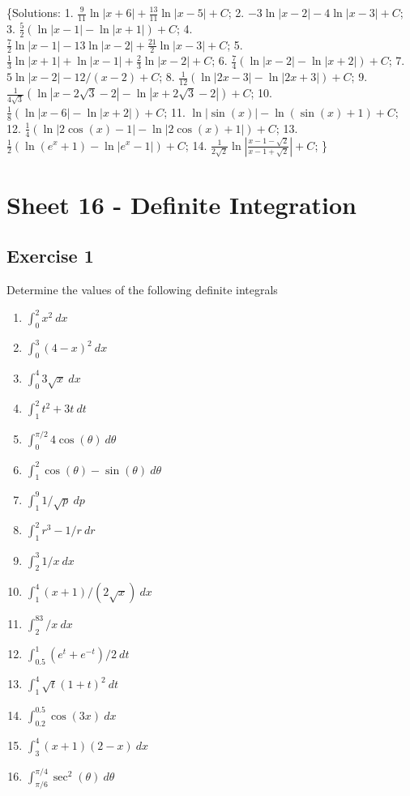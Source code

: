 \documentclass[
  11pt,
  oneside]{book}
\providecommand{\tightlist}{%
  \setlength{\itemsep}{0pt}\setlength{\parskip}{0pt}}
\newcommand{\slide}{}
\theoremstyle{definition}
\theoremstyle{definition}
\theoremstyle{definition}
\theoremstyle{definition}
\theoremstyle{remark}
\begin{document}
\{Solutions:
1. \(\frac{9}{11}\ln|x+6| + \frac{13}{11}\ln|x-5|+C\);
2. \(-3\ln|x-2|-4\ln|x-3| + C\);
3. \(\frac{5}{2}(\ln|x-1|-\ln|x+1|)+C\);
4. \(\frac{7}{2}\ln|x-1| -13\ln|x-2|+\frac{21}{2}\ln|x-3|+C\);
5. \(\frac{1}{3}\ln|x+1|+\ln|x-1|+\frac{2}{3}\ln|x-2|+C\);
6. \(\frac{7}{4}(\ln|x-2|-\ln|x+2|) +C\);
7. \(5\ln|x-2| - 12/(x-2) +C\);
8. \(\frac{1}{12}(\ln|2x-3|-\ln|2x+3|)+C\);
9. \(\frac{1}{4\sqrt{3}}\left( \ln|x-2\sqrt{3}-2| - \ln|x+2\sqrt{3}-2| \right)+C\);
10. \(\frac{1}{8}(\ln|x-6|-\ln|x+2|) +C\);
11. \(\ln|\sin(x)| - \ln(\sin(x)+1) + C\);
12. \(\frac{1}{4}\left( \ln|2\cos(x)-1| -\ln|2\cos(x)+1| \right) +C\);
13. \(\frac{1}{2}\left( \ln(e^x+1) - \ln|e^x-1| \right) + C\);
14. \(\frac{1}{2\sqrt{2}}\ln\left|\frac{x-1-\sqrt{2}}{x-1+\sqrt{2}}\right| +C\);
\}

\slide

\section{Sheet 16 - Definite Integration}\label{sheet-16---definite-integration}

\subsection*{Exercise 1}\label{exercise-1-6}

Determine the values of the following definite integrals

\begin{enumerate}
\def\labelenumi{\arabic{enumi}.}
\tightlist
\item
  \(\int_0^2 x^2\ dx\)
\item
  \(\int_0^3 (4-x)^2\ dx\)
\item
  \(\int_0^4 3\sqrt{x}\ dx\)
\item
  \(\int_1^2 t^2+3t\ dt\)
\item
  \(\int_0^{\pi/2}4\cos(\theta) \ d\theta\)
\item
  \(\int_1^2 \cos(\theta)-\sin(\theta)\ d\theta\)
\item
  \(\int_1^9 1/\sqrt{p}\ dp\)
\item
  \(\int_1^2 r^3-1/r\ dr\)
\item
  \(\int_2^3 1/x\ dx\)
\item
  \(\int_1^4 (x+1)/(2\sqrt{x})\ dx\)
\item
  \(\int_2^83/x \ dx\)
\item
  \(\int_{0.5}^1(e^t+e^{-t})/2 \ dt\)
\item
  \(\int_1^4 \sqrt{t}(1+t)^2 \ dt\)
\item
  \(\int_{0.2}^{0.5} \cos(3x)\ dx\)
\item
  \(\int_3^4 (x+1)(2-x)\ dx\)
\item
  \(\int_{\pi/6}^{\pi/4} \sec^2(\theta)\ d\theta\)
\end{enumerate}
\end{document}
